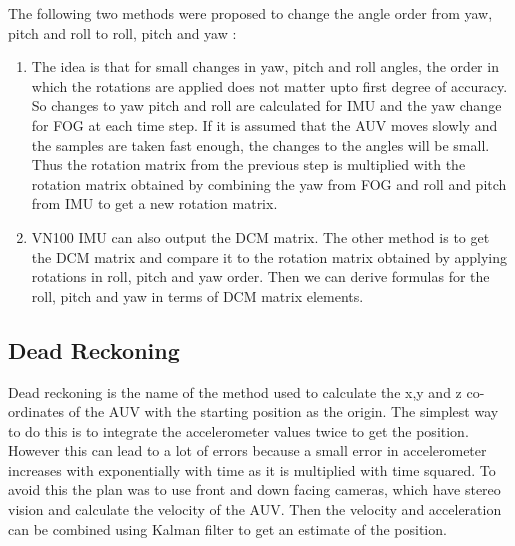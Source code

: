 The following two methods were proposed to change the angle order from yaw, pitch and roll to roll, pitch and yaw :
\begin{enumerate}
\item The idea is that for small changes in yaw, pitch and roll angles, the order in which the rotations are applied does not matter upto first degree of accuracy. So changes to yaw pitch and roll are calculated for IMU and the yaw change for FOG at each time step. If it is assumed that the AUV moves slowly and the samples are taken fast enough, the changes to the angles will be small. Thus the rotation matrix from the previous step is multiplied with the rotation matrix obtained by combining the yaw from FOG and roll and pitch from IMU to get a new rotation matrix.
\item VN100 IMU can also output the DCM matrix. The other method is to get the DCM matrix and compare it to the rotation matrix obtained by applying rotations in roll, pitch and yaw order. Then we can derive formulas for the roll, pitch and yaw in terms of DCM matrix elements. 
\end{enumerate}

\subsection{Dead Reckoning}
Dead reckoning is the name of the method used to calculate the x,y and z co-ordinates of the AUV with the starting position as the origin. The simplest way to do this is to integrate the accelerometer values twice to get the position. However this can lead to a lot of errors because a small error in accelerometer increases with exponentially with time as it is multiplied with time squared. To avoid this the plan was to use front and down facing cameras, which have stereo vision and calculate the velocity of the AUV. Then the velocity and acceleration can be combined using Kalman filter to get an estimate of the position.

%
